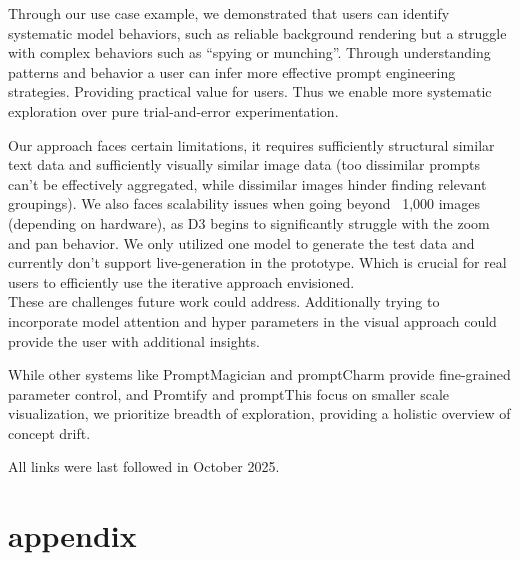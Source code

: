 \documentclass[
  a4paper,  %
  twoside,  %
  bibliography=totoc,
  headsepline,
  cleardoublepage=empty,
  parskip=half,
  draft=false
]{scrbook}
\begin{document}
Through our use case example, we demonstrated that users can identify systematic model behaviors, such as reliable background rendering but a struggle with complex behaviors such as \enquote{spying or munching}. Through understanding patterns and behavior a user can infer more effective prompt engineering strategies. Providing practical value for users. Thus we enable more systematic exploration over pure trial-and-error experimentation.

Our approach faces certain limitations, it requires sufficiently structural similar text data and sufficiently visually similar image data (too dissimilar prompts can't be effectively aggregated, while dissimilar images hinder finding relevant groupings). We also faces scalability issues when going beyond ~1,000 images (depending on hardware), as D3 begins to significantly struggle with the zoom and pan behavior. We only utilized one model to generate the test data and currently don't support live-generation in the prototype. Which is crucial for real users to efficiently use the iterative approach envisioned.\\
 These are challenges future work could address. Additionally trying to incorporate model attention and hyper parameters in the visual approach could provide the user with additional insights. 

While other systems like PromptMagician and promptCharm \cite{promptCharm,PromptMagician} provide fine-grained parameter control, and Promtify and promptThis \cite{brade2023promptifytexttoimagegenerationinteractive,guo2024prompthisvisualizingprocessinfluence} focus on smaller scale  visualization, we prioritize breadth of exploration, providing a holistic overview of concept drift. 



\printbibliography

All links were last followed in October 2025.

\appendix
%
\chapter{appendix}
\end{document}

